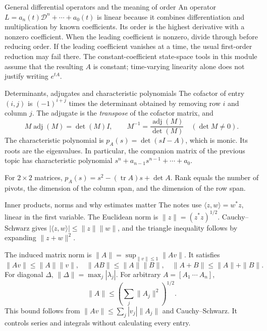\begin{concept}{General differential operators and the meaning of order}
An operator $L=a_n(t)\mathcal D^n+\cdots+a_0(t)$ is linear because it combines differentiation and multiplication by known coefficients. Its order is the highest derivative with a nonzero coefficient. When the leading coefficient is nonzero, divide through before reducing order. If the leading coefficient vanishes at a time, the usual first-order reduction may fail there. The constant-coefficient state-space tools in this module assume that the resulting $A$ is constant; time-varying linearity alone does not justify writing $e^{tA}$.
\end{concept}

\begin{concept}{Determinants, adjugates and characteristic polynomials}
The cofactor of entry $(i,j)$ is $(-1)^{i+j}$ times the determinant obtained by removing row $i$ and column $j$. The adjugate is the \emph{transpose} of the cofactor matrix, and
\[M\operatorname{adj}(M)=\det(M)I,\qquad M^{-1}=\frac{\operatorname{adj}(M)}{\det(M)}\quad(\det M\ne0).\]
The characteristic polynomial is $p_A(s)=\det(sI-A)$, which is monic. Its roots are the eigenvalues. In particular, the companion matrix of the previous topic has characteristic polynomial $s^n+a_{n-1}s^{n-1}+\cdots+a_0$.

For $2\times2$ matrices, $p_A(s)=s^2-(\operatorname{tr}A)s+\det A$. Rank equals the number of pivots, the dimension of the column span, and the dimension of the row span.
\end{concept}
\begin{concept}{Inner products, norms and why estimates matter}
The notes use $\langle z,w\rangle=w^*z$, linear in the first variable. The Euclidean norm is $\|z\|=(z^*z)^{1/2}$. Cauchy--Schwarz gives $|\langle z,w\rangle|\leq\|z\|\|w\|$, and the triangle inequality follows by expanding $\|z+w\|^2$.

The induced matrix norm is $\|A\|=\sup_{\|v\|\leq1}\|Av\|$. It satisfies
\[\|Av\|\leq\|A\|\|v\|,\quad\|AB\|\leq\|A\|\|B\|,\quad\|A+B\|\leq\|A\|+\|B\|.\]
For diagonal $\Delta$, $\|\Delta\|=\max_j|\lambda_j|$. For arbitrary $A=[A_1\ \cdots\ A_n]$,
\[\|A\|\leq\left(\sum_j\|A_j\|^2\right)^{1/2}.\]
This bound follows from $\|Av\|\leq\sum_j|v_j|\|A_j\|$ and Cauchy--Schwarz. It controls series and integrals without calculating every entry.
\end{concept}
